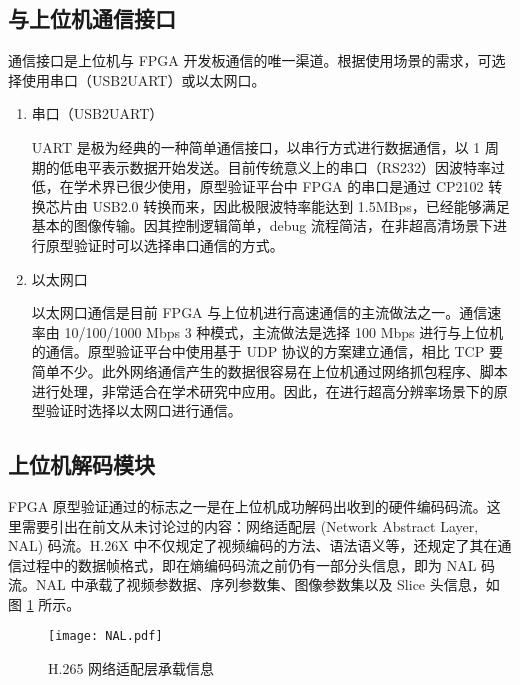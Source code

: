\subsection{与上位机通信接口}
通信接口是上位机与 FPGA 开发板通信的唯一渠道。根据使用场景的需求，可选择使用串口（USB2UART）或以太网口。
\begin{enumerate}
    \item 串口（USB2UART）

        UART 是极为经典的一种简单通信接口，以串行方式进行数据通信，以 1 周期的低电平表示数据开始发送。目前传统意义上的串口（RS232）因波特率过低，在学术界已很少使用，原型验证平台中 FPGA 的串口是通过 CP2102 转换芯片由 USB2.0 转换而来，因此极限波特率能达到 1.5MBps，已经能够满足基本的图像传输。因其控制逻辑简单，debug 流程简洁，在非超高清场景下进行原型验证时可以选择串口通信的方式。

    \item 以太网口

        以太网口通信是目前 FPGA 与上位机进行高速通信的主流做法之一。通信速率由 10/100/1000 Mbps 3 种模式，主流做法是选择 100 Mbps 进行与上位机的通信。原型验证平台中使用基于 UDP 协议的方案建立通信，相比 TCP 要简单不少。此外网络通信产生的数据很容易在上位机通过网络抓包程序、脚本进行处理，非常适合在学术研究中应用。因此，在进行超高分辨率场景下的原型验证时选择以太网口进行通信。
\end{enumerate}


\subsection{上位机解码模块}
FPGA 原型验证通过的标志之一是在上位机成功解码出收到的硬件编码码流。这里需要引出在前文从未讨论过的内容：网络适配层 (Network Abstract Layer, NAL) 码流。H.26X 中不仅规定了视频编码的方法、语法语义等，还规定了其在通信过程中的数据帧格式，即在熵编码码流之前仍有一部分头信息，即为 NAL 码流。NAL 中承载了视频参数据、序列参数集、图像参数集以及 Slice 头信息，如图 \ref{fig:NAL} 所示。
\begin{figure}[hbt]
    \centering
    \texttt{[image: NAL.pdf]}
    \caption{H.265 网络适配层承载信息}
    \label{fig:NAL}
\end{figure}

